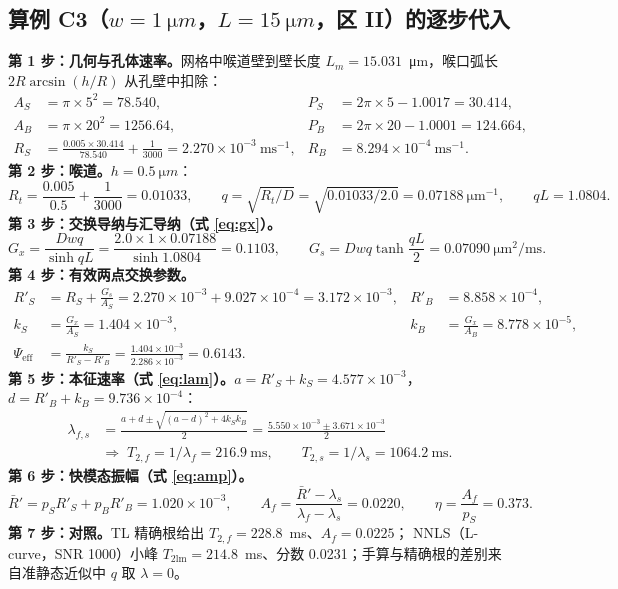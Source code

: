\subsection{算例 C3（$w=\SI{1}{\micro m}$，$L=\SI{15}{\micro m}$，区 II）的逐步代入}
\textbf{第 1 步：几何与孔体速率。}网格中喉道壁到壁长度 $L_m=15.031$~\si{\micro m}，喉口弧长 $2R\arcsin(h/R)$ 从孔壁中扣除：
\begin{align*}
A_S&=\pi\times5^2=78.540, & P_S&=2\pi\times5-1.0017=30.414,\\
A_B&=\pi\times20^2=1256.64, & P_B&=2\pi\times20-1.0001=124.664,\\
R_S&=\frac{0.005\times30.414}{78.540}+\frac{1}{3000}=2.270\times10^{-3}\ \mathrm{ms^{-1}}, & R_B&=8.294\times10^{-4}\ \mathrm{ms^{-1}}.
\end{align*}
\textbf{第 2 步：喉道。}$h=\SI{0.5}{\micro m}$：
\[
R_t=\frac{0.005}{0.5}+\frac{1}{3000}=0.01033,\qquad q=\sqrt{R_t/D}=\sqrt{0.01033/2.0}=0.07188\ \mathrm{\mu m^{-1}},\qquad qL=1.0804.
\]
\textbf{第 3 步：交换导纳与汇导纳（式 \eqref{eq:gx}）。}
\[
G_x=\frac{Dwq}{\sinh qL}=\frac{2.0\times1\times0.07188}{\sinh 1.0804}=0.1103,\qquad
G_s=Dwq\tanh\frac{qL}{2}=0.07090\ \mathrm{\mu m^2/ms}.
\]
\textbf{第 4 步：有效两点交换参数。}
\begin{align*}
R'_S&=R_S+\frac{G_s}{A_S}=2.270\times10^{-3}+9.027\times10^{-4}=3.172\times10^{-3}, & R'_B&=8.858\times10^{-4},\\
k_S&=\frac{G_x}{A_S}=1.404\times10^{-3}, & k_B&=\frac{G_x}{A_B}=8.778\times10^{-5},\\
\Psi_{\mathrm{eff}}&=\frac{k_S}{R'_S-R'_B}=\frac{1.404\times10^{-3}}{2.286\times10^{-3}}=0.6143. &&
\end{align*}
\textbf{第 5 步：本征速率（式 \eqref{eq:lam}）。}$a=R'_S+k_S=4.577\times10^{-3}$，$d=R'_B+k_B=9.736\times10^{-4}$：
\begin{align*}
\lambda_{f,s}&=\frac{a+d\pm\sqrt{(a-d)^2+4k_Sk_B}}{2}=\frac{5.550\times10^{-3}\pm3.671\times10^{-3}}{2}\\
&\Rightarrow\;T_{2,f}=1/\lambda_f=216.9\ \mathrm{ms},\qquad T_{2,s}=1/\lambda_s=1064.2\ \mathrm{ms}.
\end{align*}
\textbf{第 6 步：快模态振幅（式 \eqref{eq:amp}）。}
\[
\bar R'=p_SR'_S+p_BR'_B=1.020\times10^{-3},\qquad A_f=\frac{\bar R'-\lambda_s}{\lambda_f-\lambda_s}=0.0220,\qquad \eta=\frac{A_f}{p_S}=0.373.
\]
\textbf{第 7 步：对照。}TL 精确根给出 $T_{2,f}=228.8$~ms、$A_f=0.0225$；
NNLS（L-curve，SNR 1000）小峰 $T_{2\mathrm{lm}}=214.8$~ms、分数 0.0231；手算与精确根的差别来自准静态近似中 $q$ 取 $\lambda=0$。

